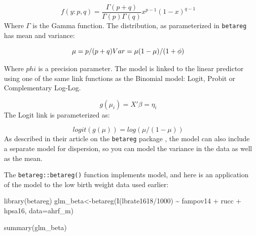 \documentclass[
]{article}
\newenvironment{Shaded}{\begin{snugshade}}{\end{snugshade}}
\newcommand{\AttributeTok}[1]{\textcolor[rgb]{0.77,0.63,0.00}{#1}}
\newcommand{\DecValTok}[1]{\textcolor[rgb]{0.00,0.00,0.81}{#1}}
\newcommand{\FunctionTok}[1]{\textcolor[rgb]{0.00,0.00,0.00}{#1}}
\newcommand{\NormalTok}[1]{#1}
\newcommand{\OtherTok}[1]{\textcolor[rgb]{0.56,0.35,0.01}{#1}}
\newcommand{\SpecialCharTok}[1]{\textcolor[rgb]{0.00,0.00,0.00}{#1}}
\begin{document}
\[
f(y:p,q) = \frac{\Gamma(p +
q)}{\Gamma(p)\Gamma(q)}x^{p - 1}(1 - x)^{q - 1}
\]
Where \(\Gamma\) is the Gamma function. The distribution, as parameterized in \texttt{betareg} has mean and variance:

\[
\mu = p/(p+q) \\
Var = \mu (1-\mu)/ (1+\phi)
\]

Where \(phi\) is a precision parameter. The model is linked to the linear predictor using one of the same link functions as the Binomial model: Logit, Probit or Complementary Log-Log.

\[g(\mu_i) = X'\beta = \eta_i\]
The Logit link is parameterized as:

\[logit(g(\mu)) = log(\mu / (1-\mu))\]
As described in their article on the \texttt{betareg} package \citep{cribari-neto_beta_2010}, the model can also include a separate model for dispersion, so you can model the variance in the data as well as the mean.

The \texttt{betareg::betareg()} function implements model, and here is an application of the model to the low birth weight data used earlier:

\begin{Shaded}
\begin{Highlighting}[]
\FunctionTok{library}\NormalTok{(betareg)}
\NormalTok{glm\_beta}\OtherTok{\textless{}{-}}\FunctionTok{betareg}\NormalTok{(}\FunctionTok{I}\NormalTok{(lbrate1618}\SpecialCharTok{/}\DecValTok{1000}\NormalTok{) }\SpecialCharTok{\textasciitilde{}}\NormalTok{  fampov14 }\SpecialCharTok{+}\NormalTok{ rucc }\SpecialCharTok{+}\NormalTok{ hpsa16, }
                  \AttributeTok{data=}\NormalTok{ahrf\_m)}

\FunctionTok{summary}\NormalTok{(glm\_beta)}
\end{Highlighting}
\end{Shaded}
\end{document}
